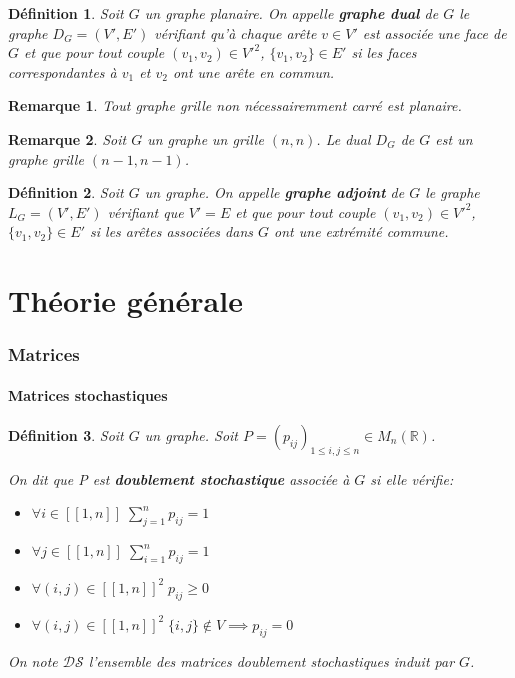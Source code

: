 \documentclass{article}
\newtheorem{definition}{Définition}[section]
\newtheorem{remark}{Remarque}[section]
\begin{document}
\begin{definition}
Soit $G$ un graphe planaire. On appelle \textbf{graphe dual} de $G$ le graphe $D_{G}=(V',E')$ vérifiant qu'à chaque arête $v \in V'$ est associée une face de $G$ et que pour tout couple $(v_{1},v_{2}) \in V'^{2}$, $\{v_{1},v_{2}\} \in E'$ si les faces correspondantes à $v_{1}$ et $v_{2}$ ont une arête en commun.
\end{definition}

\begin{remark}
Tout graphe grille non nécessairemment carré est planaire.
\end{remark}

\begin{remark}
Soit $G$ un graphe un grille $(n,n)$. Le dual $D_G$ de $G$ est un graphe grille $(n-1,n-1)$.
\end{remark}

\begin{definition}
Soit $G$ un graphe. On appelle \textbf{graphe adjoint} de $G$ le graphe $L_{G}=(V',E')$ vérifiant que $V'=E$ et que pour tout couple $(v_{1},v_{2}) \in V'^{2}$, $\{v_{1},v_{2}\} \in E'$ si les arêtes associées dans $G$ ont une extrémité commune.
\end{definition}


\part{Théorie générale}

\section{Matrices}
\subsection{Matrices stochastiques}

\begin{definition}
Soit $G$ un graphe.
Soit $P={(p_{ij})}_{1 \le i,j \le n} \in M_{n}(\mathbb{R})$.

On dit que P est \textbf{doublement stochastique} associée à $G$ si elle vérifie:

\begin{itemize}
\item $\forall i \in [\![1,n]\!] \; \sum\limits_{j=1}^{n}p_{ij}=1$
\item  $\forall j \in [\![1,n]\!] \; \sum\limits_{i=1}^{n}p_{ij}=1$
\item $\forall (i,j) \in {[\![1,n]\!]}^{2} \; p_{ij} \ge 0$
\item  $\forall (i,j) \in {[\![1,n]\!]}^{2} \; \{i,j\} \notin V \implies p_{ij}=0$
\end{itemize}

On note $\mathcal{D}\mathcal{S}$ l'ensemble des matrices doublement stochastiques induit par $G$.
\end{definition}
\end{document}
